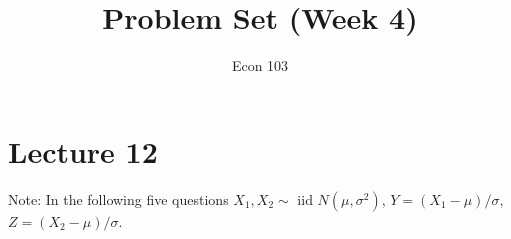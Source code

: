 \documentclass[addpoints,12pt]{exam}\usepackage[]{graphicx}\usepackage[]{color}
\title{Problem Set (Week 4)}
\author{Econ 103}
\date{}
\begin{document}
\maketitle





\section*{Lecture 12}

Note: In the following five questions  $X_1, X_2 \sim \mbox{ iid } N(\mu, \sigma^2)$, $Y = (X_1 - \mu)/\sigma$, $Z = (X_2 - \mu)/\sigma$.
\end{document}
